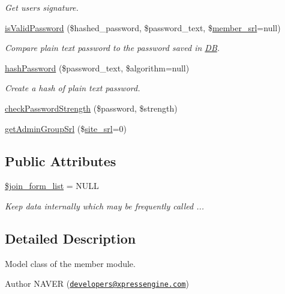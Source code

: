 \begin{DoxyCompactItemize}
\begin{DoxyCompactList}\small\item\em Get user\textquotesingle{}s signature. \end{DoxyCompactList}\item 
\hyperlink{classmemberModel_a5d2727323d47e4304998311424bb4091}{is\+Valid\+Password} (\$hashed\+\_\+password, \$password\+\_\+text, \$\hyperlink{ko_8install_8php_aa61f9e08f0fe505094d26f8143f30bbd}{member\+\_\+srl}=null)
\begin{DoxyCompactList}\small\item\em Compare plain text password to the password saved in \hyperlink{classDB}{DB}. \end{DoxyCompactList}\item 
\hyperlink{classmemberModel_a0183c4c53c2eadc045ba27d82b94412a}{hash\+Password} (\$password\+\_\+text, \$algorithm=null)
\begin{DoxyCompactList}\small\item\em Create a hash of plain text password. \end{DoxyCompactList}\item 
\hyperlink{classmemberModel_a5970b2dcba76f9fc910cc3df7de19ac7}{check\+Password\+Strength} (\$password, \$strength)
\item 
\hyperlink{classmemberModel_ad8c1aafe9a4f461404b596ff6ad3e2ed}{get\+Admin\+Group\+Srl} (\$\hyperlink{ko_8install_8php_a8b1406b4ad1048041558dce6bfe89004}{site\+\_\+srl}=0)
\end{DoxyCompactItemize}
\subsection*{Public Attributes}
\begin{DoxyCompactItemize}
\item 
\hyperlink{classmemberModel_aa9b942e17ed74955c8700dd74d75d2b2}{\$join\+\_\+form\+\_\+list} = N\+U\+LL
\begin{DoxyCompactList}\small\item\em Keep data internally which may be frequently called ... \end{DoxyCompactList}\end{DoxyCompactItemize}


\subsection{Detailed Description}
Model class of the member module. 

\begin{DoxyAuthor}{Author}
N\+A\+V\+ER (\href{mailto:developers@xpressengine.com}{\tt developers@xpressengine.\+com}) 
\end{DoxyAuthor}


